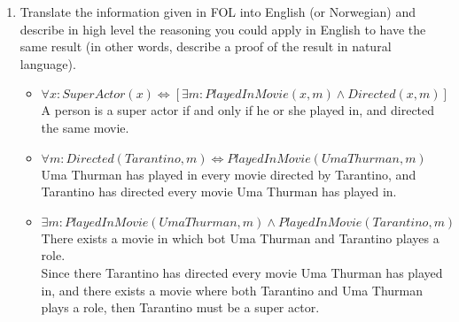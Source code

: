 \documentclass[paper=a4, fontsize=11pt]{scrartcl} %
\numberwithin{equation}{section} %
\numberwithin{figure}{section} %
\numberwithin{table}{section} %
\begin{document}
\begin{enumerate}
\begin{enumerate}
	\end{enumerate}

	\item
	Translate the information given in FOL into English (or Norwegian) and describe in high level the reasoning you could apply in English to have the same result (in other words, describe a proof of the result in natural language).\\
	\begin{itemize}
		\item 
		$\forall x: SuperActor(x) \Leftrightarrow [\exists m: PlayedInMovie(x,m) \wedge Directed(x,m)]$\\

		A person is a super actor if and only if he or she played in, and directed the same movie.\\
		
		\item
		$\forall m: Directed(Tarantino,m) \Leftrightarrow PlayedInMovie(UmaThurman,m)$\\
		
		Uma Thurman has played in every movie directed by Tarantino, and Tarantino has directed every movie Uma Thurman has played in.\\

		\item
		$\exists m: PlayedInMovie(UmaThurman,m) \wedge PlayedInMovie(Tarantino,m)$\\

		There exists a movie in which bot Uma Thurman and Tarantino playes a role.\\
		
		Since there Tarantino has directed every movie Uma Thurman has played in, and there exists a movie where both Tarantino and Uma Thurman plays a role, then Tarantino must be a super actor.

	\end{itemize}
\end{enumerate}
\end{document}
